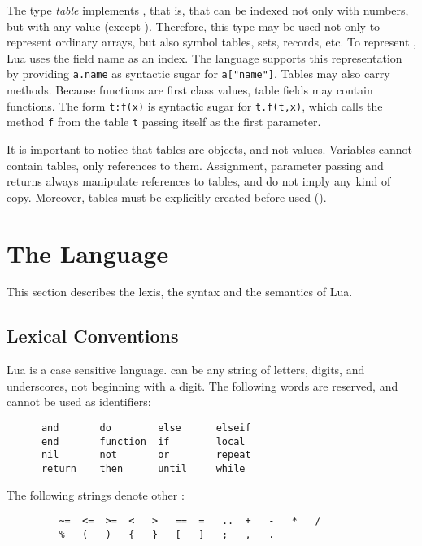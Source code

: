 The type {\em table} implements ,
that is,  that can be indexed not only with numbers,
but with any value (except \nil).
Therefore, this type may be used not only to represent ordinary arrays,
but also symbol tables, sets, records, etc.
To represent , Lua uses the field name as an index.
The language supports this representation by
providing \verb'a.name' as syntactic sugar for \verb'a["name"]'.
Tables may also carry methods.
Because functions are first class values,
table fields may contain functions.
The form \verb't:f(x)' is syntactic sugar for \verb't.f(t,x)',
which calls the method \verb'f' from the table \verb't' passing
itself as the first parameter.

It is important to notice that tables are objects, and not values.
Variables cannot contain tables, only references to them.
Assignment, parameter passing and returns always manipulate references
to tables, and do not imply any kind of copy.
Moreover, tables must be explicitly created before used
().



\section{The Language}

This section describes the lexis, the syntax and the semantics of Lua.


\subsection{Lexical Conventions} \label{lexical}

Lua is a case sensitive language.
 can be any string of letters, digits, and underscores,
not beginning with a digit.
The following words are reserved, and cannot be used as identifiers:
\begin{verbatim}
      and       do        else      elseif
      end       function  if        local
      nil       not       or        repeat
      return    then      until     while
\end{verbatim}

The following strings denote other :
\begin{verbatim}
         ~=  <=  >=  <   >   ==  =   ..  +   -   *   /
         %   (   )   {   }   [   ]   ;   ,   .
\end{verbatim}

